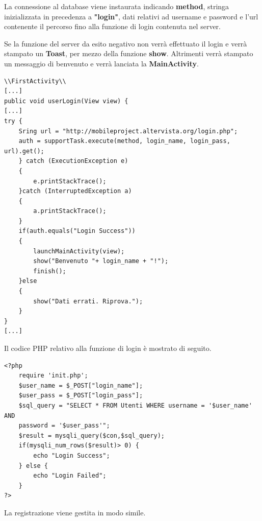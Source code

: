 \documentclass[a4paper, 50pt, twoside]{article}
\begin{document}
La connessione al database viene instaurata indicando \textbf{method}, stringa inizializzata in precedenza a \textbf{"login"}, dati relativi ad username e password e l'url contenente il percorso fino alla funzione di login contenuta nel server.

Se la funzione del server da esito negativo non verrà effettuato il login e verrà stampato un \textbf{Toast}, per mezzo della funzione \textbf{show}. Altrimenti verrà stampato un messaggio di benvenuto e verrà lanciata la \textbf{MainActivity}.
\begin{lstlisting}
\\FirstActivity\\
[...]
public void userLogin(View view) {
[...]
try {
	Sring url = "http://mobileproject.altervista.org/login.php";
	auth = supportTask.execute(method, login_name, login_pass, url).get();
	} catch (ExecutionException e)
	{
		e.printStackTrace();
	}catch (InterruptedException a)
	{
		a.printStackTrace();
	}
	if(auth.equals("Login Success"))
	{
		launchMainActivity(view);
		show("Benvenuto "+ login_name + "!");
		finish();
	}else
	{
		show("Dati errati. Riprova.");
	}
}
[...]
\end{lstlisting}
Il codice PHP relativo alla funzione di login è mostrato di seguito.
\begin{lstlisting}
<?php
	require 'init.php';
	$user_name = $_POST["login_name"];  
	$user_pass = $_POST["login_pass"];  
	$sql_query = "SELECT * FROM Utenti WHERE username = '$user_name' AND 
	password = '$user_pass'";  
	$result = mysqli_query($con,$sql_query);  
	if(mysqli_num_rows($result)> 0) {    
		echo "Login Success";  
	} else {
		echo "Login Failed";  
	}  
?>
\end{lstlisting}
La registrazione viene gestita in modo simile.
\end{document}
